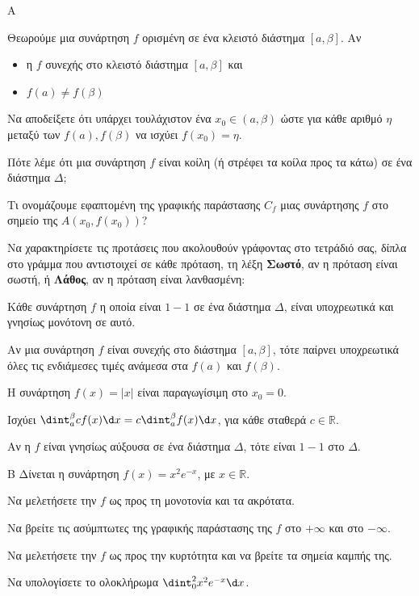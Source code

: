 \vspace{0.5cm}
\begin{thema}{Α}
\begin{erwthma}
    \item Θεωρούμε μια συνάρτηση $f$ ορισμένη σε ένα κλειστό διάστημα $[a,\beta]$. Αν
\begin{itemize}
\item η $f$ συνεχής στο κλειστό διάστημα $[a,\beta]$ και 
\item $f(a)\neq f(\beta)$
\end{itemize}
Να αποδείξετε ότι υπάρχει τουλάχιστον ένα $ x_0\in(a,\beta) $ ώστε για κάθε αριθμό $ \eta $ μεταξύ των $ f(a),f(\beta) $ να ισχύει $ f(x_0)=\eta $. 
    \item Πότε λέμε ότι μια συνάρτηση $f$ είναι κοίλη (ή στρέφει τα κοίλα προς τα κάτω) σε ένα διάστημα $\Delta$; 
    \item Τι ονομάζουμε εφαπτομένη της γραφικής παράστασης $C_f$ μιας συνάρτησης $f$ στο σημείο της $A(x_0, f(x_0))$? 
    \item Να χαρακτηρίσετε τις προτάσεις που ακολουθούν γράφοντας στο τετράδιό σας, δίπλα στο γράμμα που αντιστοιχεί σε κάθε πρόταση, τη λέξη \textbf{Σωστό},
αν η πρόταση είναι σωστή, ή \textbf{Λάθος}, αν η πρόταση είναι λανθασμένη:
    \begin{alist}
        \item Κάθε συνάρτηση $f$ η οποία είναι $1-1$ σε ένα διάστημα $\Delta$, είναι υποχρεωτικά και γνησίως μονότονη σε αυτό.
        \item Αν μια συνάρτηση $f$ είναι συνεχής στο διάστημα $[a,\beta]$, τότε παίρνει υποχρεωτικά όλες τις ενδιάμεσες τιμές ανάμεσα στα $f(a)$ και $f(\beta)$.
        \item Η συνάρτηση $f(x)=|x|$ είναι παραγωγίσιμη στο $x_0=0$.
        \item Ισχύει $\dint_a^\beta cf(x)\d x = c\dint_a^\beta f(x)\d x$, για κάθε σταθερά $c \in \mathbb{R}$.
        \item Αν η $f$ είναι γνησίως αύξουσα σε ένα διάστημα $\Delta$, τότε είναι $1-1$ στο $\Delta$.
    \end{alist} 
\end{erwthma}
\end{thema}

\begin{thema}{Β}
Δίνεται η συνάρτηση $f(x) = x^2 e^{-x}$, με $x\in\mathbb{R}$.
\begin{erwthma}
    \item Να μελετήσετε την $f$ ως προς τη μονοτονία και τα ακρότατα. 
    \item Να βρείτε τις ασύμπτωτες της γραφικής παράστασης της $f$ στο $+\infty$ και στο $-\infty$. 
    \item Να μελετήσετε την $f$ ως προς την κυρτότητα και να βρείτε τα σημεία καμπής της. 
    \item Να υπολογίσετε το ολοκλήρωμα $\dint_0^2 x^2 e^{-x}\d x$. 
\end{erwthma}
\end{thema}


